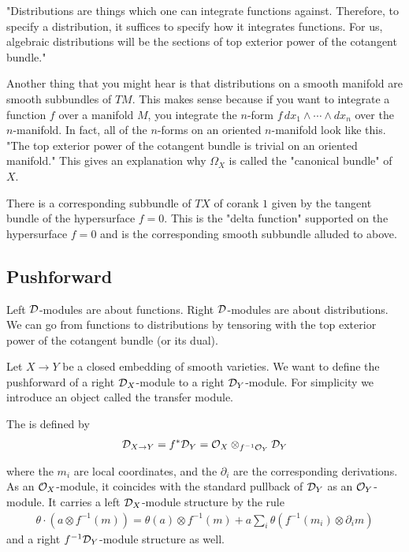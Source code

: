 \begin{example}
	"Distributions are things which one can integrate functions against.
	Therefore, to specify a distribution, it suffices to specify how it integrates functions. For us,
	algebraic distributions will be the sections of top exterior power of the cotangent bundle."

	\hfill

	Another thing that you might hear is that distributions
	on a smooth manifold are smooth subbundles of $TM$. This makes sense because if you want to integrate
	a function $f$ over a manifold $M$, you integrate the $n$-form $f\,dx_1\wedge \cdots \wedge dx_n$ over
	the $n$-manifold. In fact, all of the $n$-forms on an oriented $n$-manifold look like this.
	"The top exterior power of the cotangent bundle is trivial on an oriented manifold." This gives an
	explanation why $\Omega_X$ is called the "canonical bundle" of $X$.

	\hfill

	There is a corresponding subbundle of $TX$ of corank $1$ given by the tangent bundle of the
	hypersurface $f=0$. This is the "delta function" supported on the hypersurface $f=0$ and is the
	corresponding smooth subbundle alluded to above.
\end{example}

\subsection{Pushforward}
Left ${\mathcal{D}}$-modules are about functions. Right ${\mathcal{D}}$-modules are about distributions.
We can go from functions to distributions by tensoring with the top exterior power of the cotangent bundle
(or its dual).

\hfill

Let $X\to Y$ be a closed embedding of smooth varieties. We want to define the pushforward
of a right ${\mathcal{D}}_X$-module to a right ${\mathcal{D}}_Y$-module. For simplicity we
introduce an object called the transfer module.

\begin{definition}
	The  is defined by \begin{align*}
		{\mathcal{D}}_{X\to Y} = f^*{\mathcal{D}}_Y = {\mathcal{O}}_X\otimes_{f^{-1}{\mathcal{O}}_Y} {\mathcal{D}}_Y
	\end{align*}
\end{definition}
where the $m_i$ are local coordinates, and the $\partial_i$ are the corresponding derivations.
As an ${\mathcal{O}}_X$-module, it coincides with the standard pullback of ${\mathcal{D}}_Y$ as an ${\mathcal{O}}_Y$-module.
It carries a left ${\mathcal{D}}_X$-module structure by the rule \begin{align*}
	\theta \cdot (a\otimes f^{-1}(m)) = \theta(a)\otimes f^{-1}(m) + a\sum_i \theta(f^{-1}(m_i)\otimes \partial_i m)
\end{align*} and a right $f^{-1}{\mathcal{D}}_Y$-module structure as well.

